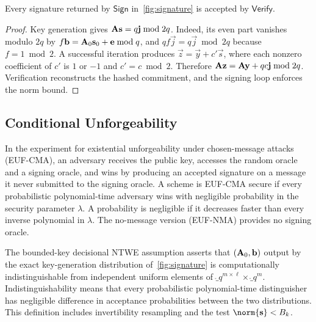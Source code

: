 \begin{lemma}
\label{lem:basic-correctness}
Every signature returned by $\mathsf{Sign}$ in~\cref{fig:signature} is accepted by $\mathsf{Verify}$.
\end{lemma}
\begin{proof}
Key generation gives $\mathbf{A}\mathbf{s}=q\mathbf{j}\bmod2q$. Indeed, its even part vanishes modulo $2q$ by $f\mathbf{b}=\mathbf{A}_0\mathbf{s}_0+\mathbf{e}\bmod q$, and $qf\vec j=q\vec j\bmod2q$ because $f=1\bmod2$. A successful iteration produces $\vec z=\vec y+c'\vec s$, where each nonzero coefficient of $c'$ is $1$ or $-1$ and $c'=c\bmod2$. Therefore $\mathbf{A}\mathbf{z}=\mathbf{A}\mathbf{y}+qc\mathbf{j}\bmod2q$. Verification reconstructs the hashed commitment, and the signing loop enforces the norm bound.
\end{proof}

\subsection{Conditional Unforgeability}

\begin{definition}
\label{def:euf-cma}
In the experiment for existential unforgeability under chosen-message attacks (EUF-CMA), an adversary receives the public key, accesses the random oracle and a signing oracle, and wins by producing an accepted signature on a message it never submitted to the signing oracle. A scheme is EUF-CMA secure if every probabilistic polynomial-time adversary wins with negligible probability in the security parameter $\lambda$. A probability is negligible if it decreases faster than every inverse polynomial in $\lambda$. The no-message version (EUF-NMA) provides no signing oracle.
\end{definition}

\begin{definition}
\label{def:ntwe}
The bounded-key decisional NTWE assumption asserts that $(\mathbf{A}_0,\mathbf{b})$ output by the exact key-generation distribution of~\cref{fig:signature} is computationally indistinguishable from independent uniform elements of $\ring_q^{m\times\ell}\times\ring_q^m$. Indistinguishability means that every probabilistic polynomial-time distinguisher has negligible difference in acceptance probabilities between the two distributions. This definition includes invertibility resampling and the test $\norm{\vec s}<B_k$.
\end{definition}

